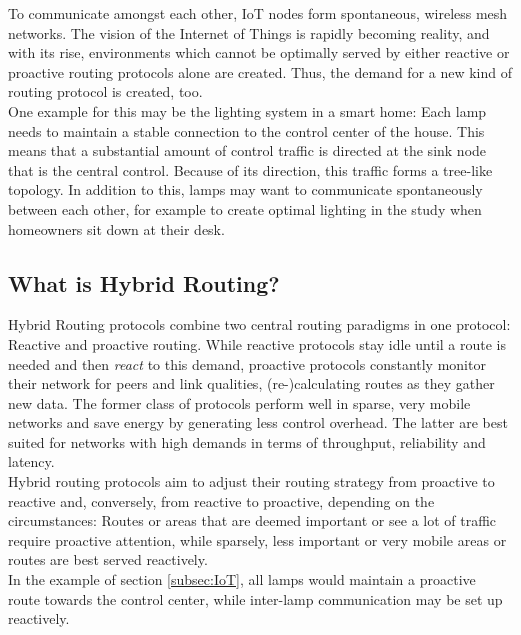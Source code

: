 \documentclass[a4paper,10pt]{scrartcl}
\begin{document}
To communicate amongst each other, IoT nodes form spontaneous, wireless mesh networks.
The vision of the Internet of Things is rapidly becoming reality, and with its rise, environments which cannot be optimally served by either reactive or proactive routing protocols alone are created. Thus, the demand for a new kind of routing protocol is created, too.\\
One example for this may be the lighting system in a smart home: Each lamp needs to maintain a stable connection to the control center of the house. This means that a substantial amount of control traffic is directed at the sink node that is the central control. Because of its direction, this traffic forms a tree-like topology. In addition to this, lamps may want to communicate spontaneously between each other, for example to create optimal lighting in the study when homeowners sit down at their desk.

\subsection{What is Hybrid Routing?}
\label{subsec:hybrid}
Hybrid Routing protocols combine two central routing paradigms in one protocol: Reactive and proactive routing. While reactive protocols stay idle until a route is needed and then \emph{react} to this demand, proactive protocols constantly monitor their network for peers and link qualities, (re-)calculating routes as they gather new data. The former class of protocols perform well in sparse, very mobile networks and save energy by generating less control overhead. The latter are best suited for networks with high demands in terms of throughput, reliability and latency.\\
Hybrid routing protocols aim to adjust their routing strategy from proactive to reactive and, conversely, from reactive to proactive, depending on the circumstances: Routes or areas that are deemed important or see a lot of traffic require proactive attention, while sparsely, less important or very mobile areas or routes are best served reactively.\\
In the example of section \ref{subsec:IoT}, all lamps would maintain a proactive route towards the control center, while inter-lamp communication may be set up reactively.\\
\end{document}
